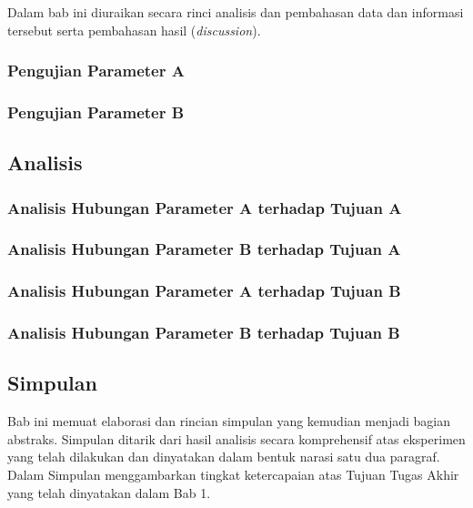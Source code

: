 \documentclass{final_project}
\begin{document}
Dalam bab ini diuraikan secara rinci analisis dan pembahasan data dan informasi tersebut serta pembahasan hasil (\textit{discussion}).

\subsubsection{Pengujian Parameter A}

\subsubsection{Pengujian Parameter B}

\subsection{Analisis}

\subsubsection{Analisis Hubungan Parameter A terhadap Tujuan A}

\subsubsection{Analisis Hubungan Parameter B terhadap Tujuan A}

\subsubsection{Analisis Hubungan Parameter A terhadap Tujuan B}

\subsubsection{Analisis Hubungan Parameter B terhadap Tujuan B}


\subsection{Simpulan}

Bab ini memuat elaborasi dan rincian simpulan yang kemudian menjadi bagian abstraks. Simpulan ditarik dari hasil analisis secara komprehensif atas eksperimen yang telah dilakukan dan dinyatakan dalam bentuk narasi satu dua paragraf. Dalam Simpulan menggambarkan tingkat ketercapaian atas Tujuan Tugas Akhir yang telah dinyatakan dalam Bab 1.
\end{document}
